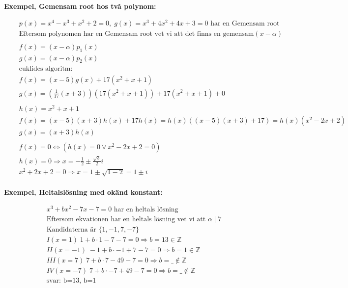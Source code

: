 \documentclass{article}
\begin{document}
\textbf{Exempel, Gemensam root hos två polynom:}\par
\begin{align*}
  &\quad  p(x)=x^4-x^3+x^2+2=0,\; g(x)=x^3+4x^2+4x+3=0 \text{ har en Gemensam root} \\
  &\quad  \text{Eftersom polynomen har en Gemensam root vet vi att det finns en gemensam} (x-\alpha) \\
  &\quad  \\
  &\quad  f(x)=(x-\alpha)p_1(x) \\  
  &\quad  g(x)=(x-\alpha)p_2(x) \\  
  &\quad  \text{euklides algoritm:} \\
  &\quad  f(x)=(x-5)g(x)+17(x^2+x+1) \\
  &\quad  g(x)=(\frac{1}{17}(x+3))(17(x^2+x+1))+17(x^2+x+1) + 0 \\
  &\quad  \\
  &\quad  h(x)=x^2+x+1 \\
  &\quad  f(x)= (x-5)(x+3)h(x)+17h(x) = h(x)((x-5)(x+3)+17) = h(x)(x^2-2x+2) \\
  &\quad  g(x)= (x+3)h(x) \\ 
  &\quad  \\
  &\quad  f(x)=0 \Leftrightarrow (h(x)=0 \lor x^2-2x+2=0) \\
  &\quad  h(x)=0 \Rightarrow x=-\frac{1}{2} \pm \frac{\sqrt{3}}{2}i \\
  &\quad  x^2+2x+2=0 \Rightarrow x=1 \pm \sqrt{1-2}=1 \pm i \\
\end{align*}


\textbf{Exempel, Heltalslösning med okänd konstant:}\par
\begin{align*}
  &\quad  x^3 + bx^2 - 7x -7 = 0 \text{ har en heltals lösning} \\
  &\quad  \text{Eftersom ekvationen har en heltals lösning vet vi att } \alpha \mid 7\\
  &\quad  \text{Kandidaterna är } \{1,-1,7,-7 \} \\
  &\quad  I   (x= 1) \;  1 + b\cdot  1 - 7 -7 = 0 \Rightarrow b=13 \in \mathbb{Z} \\
  &\quad  II  (x=-1) \; -1 + b\cdot -1 + 7 -7 = 0 \Rightarrow b= 1 \in \mathbb{Z} \\
  &\quad  III (x= 7) \;  7 + b\cdot  7 -49 -7 = 0 \Rightarrow b=\_ \notin \mathbb{Z} \\
  &\quad  IV  (x=-7) \;  7 + b\cdot -7 +49 -7 = 0 \Rightarrow b=\_ \notin \mathbb{Z} \\
  &\quad  \text{svar: b=13, b=1}
\end{align*}
\end{document}
